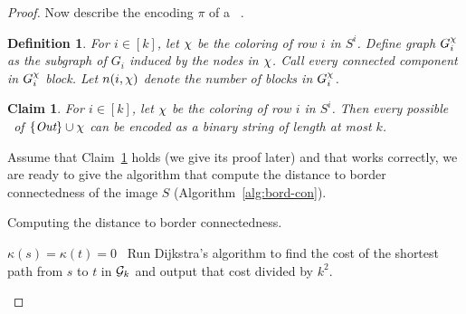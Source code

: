 \documentclass[11pt,english]{article}
\newtheorem{claim}[theorem]{Claim}
\newtheorem{definition}{Definition}[section]
\numberwithin{figure}{section}
\begin{document}
\begin{proof}
Now describe the encoding $\pi$ of a \cc\ .
\begin{definition}\label{def:block}
For $i\in[k]$, let $\chi$ be the coloring of row $i$ in $S^i$. Define graph $G^{\chi}_i$ as the subgraph of $G_i$ induced by the nodes in $\chi$. Call every connected component in $G^{\chi}_i$ {\em block}. Let $n(i,\chi)$ denote the number of blocks in $G^{\chi}_i$.
\end{definition}
\begin{claim}\label{cl:part}
For $i\in[k]$, let $\chi$ be the coloring of row $i$ in $S^i$. Then every possible \cc\ of $\{\mbox{\it Out}\}\cup\chi$ can be encoded as a binary string of length at most $k$.
\end{claim}

Assume that Claim~\ref{cl:part} holds (we give its proof later) and that \Compart works correctly, we are ready to give the algorithm that compute the distance to border connectedness of the image $S$ (Algorithm~\ref{alg:bord-con}).

\begin{algorithm}
\caption{Computing the distance to border connectedness.}
\label{alg:bord-con}
\DontPrintSemicolon
\BlankLine
{}

\nl $\kappa(s)=\kappa(t)=0$\ 
\nl {}
\nl {}
\nl {}
\nl Run Dijkstra's algorithm to find the cost of the shortest path from $s$ to $t$ in ${\mathcal G}_k$ and output that cost divided by $k^2$.\\
\end{algorithm}


\end{proof}
\end{document}
